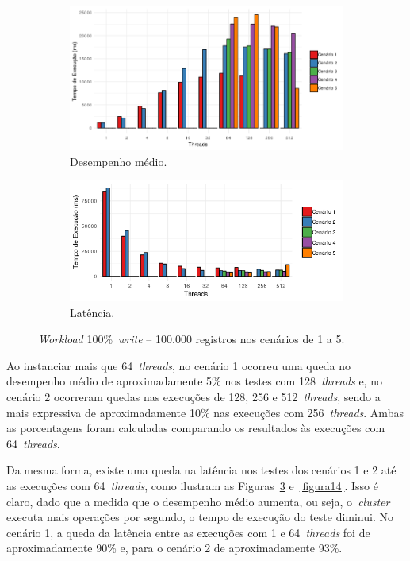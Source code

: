 \documentclass[12pt]{article}
\begin{document}
\begin{figure}
    \centering
    \begin{subfigure}[b]{0.49\textwidth}
        \centering
        \includegraphics[width=\textwidth]{images/figura11}
        \caption{Desempenho médio.}
        \label{figura11}
    \end{subfigure}
        \hfill
    \begin{subfigure}[b]{0.49\textwidth}  
        \centering 
        \includegraphics[width=\textwidth]{images/figura12}
        \caption{Latência.}%
        \label{figura12}
    \end{subfigure}
    \caption{\emph{Workload} 100\%~\emph{write} -- 100.000 registros nos cenários de 1 a 5.}
\end{figure}

Ao instanciar mais que 64~\emph{threads}, no cenário 1 ocorreu uma queda no desempenho médio de aproximadamente 5\% nos testes com 128~\emph{threads} e, no cenário 2 ocorreram quedas nas execuções de 128, 256 e 512~\emph{threads}, sendo a mais expressiva de aproximadamente 10\% nas execuções com 256~\emph{threads}. Ambas as porcentagens foram calculadas comparando os resultados às execuções com 64~\emph{threads}.

Da mesma forma, existe uma queda na latência nos testes dos cenários 1 e 2 até as execuções com 64~\emph{threads}, como ilustram as Figuras~\ref{figura12} e~\ref{figura14}. 
Isso é claro, dado que a medida que o desempenho médio aumenta, ou seja, o~\emph{cluster}  executa mais operações por segundo, o tempo de execução do teste diminui. No cenário 1, a queda da latência entre as execuções com 1 e 64~\emph{threads} foi de aproximadamente 90\% e, para o cenário 2 de aproximadamente 93\%.
\end{document}
